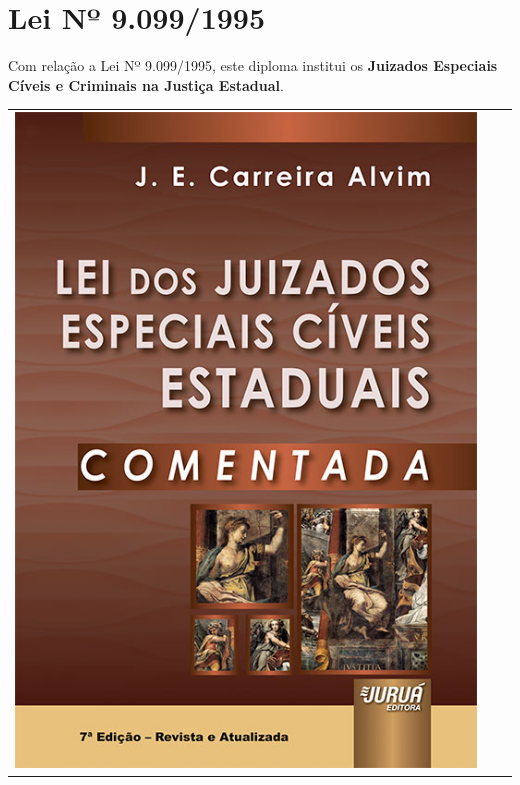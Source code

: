 \documentclass[
  letterpaper,
  DIV=11,
  numbers=noendperiod]{scrreport}
\begin{document}
\hypertarget{lei-nuxba-9.0991995}{%
\section{\texorpdfstring{\textbf{Lei Nº
9.099/1995}}{Lei Nº 9.099/1995}}\label{lei-nuxba-9.0991995}}

Com relação a Lei Nº 9.099/1995, este diploma institui os
\textbf{Juizados Especiais Cíveis e Criminais na Justiça Estadual}.

\begin{longtable}[]{@{}
  >{\centering\arraybackslash}p{}
  >{\centering\arraybackslash}p{}
  >{\centering\arraybackslash}p{}@{}}
\toprule()
\endhead
\includegraphics{./images/juizado1-01.jpg} &

\end{longtable}
\end{document}
